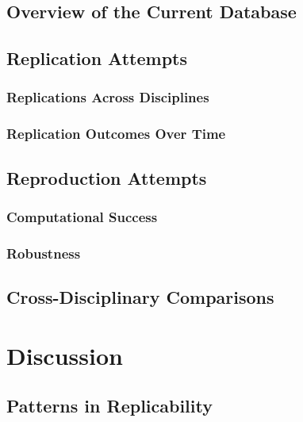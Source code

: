\documentclass[
  11pt,
  a4paper,
]{article}
\begin{document}
\subsection{Overview of the Current
Database}\label{overview-of-the-current-database}

\subsection{Replication Attempts}\label{replication-attempts}

\subsubsection{Replications Across
Disciplines}\label{replications-across-disciplines}

\subsubsection{Replication Outcomes Over
Time}\label{replication-outcomes-over-time}

\subsection{Reproduction Attempts}\label{reproduction-attempts}

\subsubsection{Computational Success}\label{computational-success}

\subsubsection{Robustness}\label{robustness}

\subsection{Cross-Disciplinary
Comparisons}\label{cross-disciplinary-comparisons}

\section{Discussion}\label{sec-discussion}

\subsection{Patterns in Replicability}\label{patterns-in-replicability}
\end{document}
